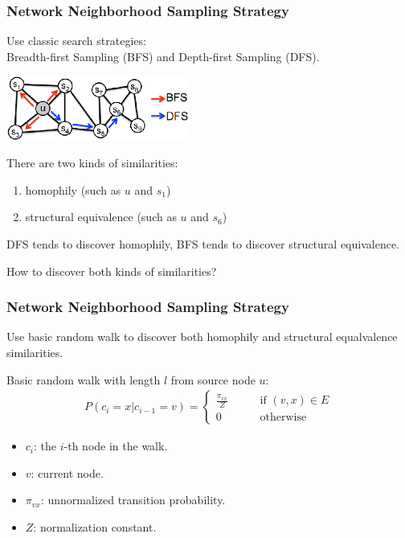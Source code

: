 \documentclass[notes, 10pt, aspectratio=169]{beamer}
\begin{document}
\begin{frame}
    \frametitle{Network Neighborhood Sampling Strategy}
    Use classic search strategies:\\
    Breadth-first Sampling (BFS) and Depth-first Sampling (DFS).
    \begin{center}
        \includegraphics[width=6cm]{./graphics/BFS_DFS.png}
    \end{center}
    There are two kinds of similarities:
    \begin{enumerate}
        \item homophily (such as $u$ and $s_1$)
        \item structural equivalence (such as $u$ and $s_6$)
    \end{enumerate}
    \par \vspace{0.2cm}
    DFS tends to discover homophily, BFS tends to discover structural equivalence.\par \vspace{0.2cm}
    How to discover both kinds of similarities?
\end{frame}

\begin{frame}
    \frametitle{Network Neighborhood Sampling Strategy}
    Use basic random walk to discover both homophily and structural equalvalence similarities.\par \vspace{0.2cm}
    Basic random walk with length $l$ from source node $u$:
    \begin{align*}
        P\left( c_i=x|c_{i-1}=v \right) =
        \begin{cases}
            \frac{\pi_{vx}}{Z}\qquad & \text{if } \left( v, x \right) \in E\\
            0\qquad & \text{otherwise}
        \end{cases}
    \end{align*}
    \begin{itemize}
        \item[] $c_i$: the $i$-th node in the walk.
        \item[] $v$: current node.
        \item[] $\pi_{vx}$: unnormalized transition probability.
        \item[] $Z$: normalization constant.
    \end{itemize}
\end{frame}
\end{document}
